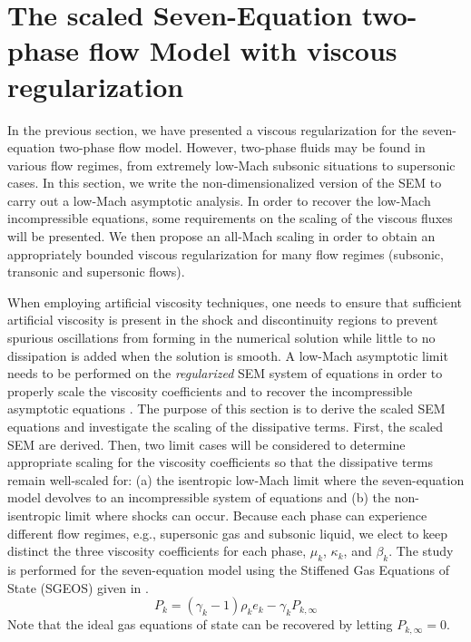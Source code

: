 \documentclass[preprint,10pt]{elsarticle}
\begin{document}
\section{The scaled Seven-Equation two-phase flow Model with viscous regularization}\label{sec:low-Mach}
%
In the previous section, we have presented a viscous regularization for the seven-equation two-phase flow model.  However,
two-phase fluids may be found in various flow regimes, from extremely low-Mach subsonic situations to supersonic cases.
In this section, we write the non-dimensionalized version of the SEM to carry out a low-Mach asymptotic analysis. In order to 
recover the low-Mach incompressible equations, some requirements on the scaling of the viscous fluxes will be presented.  
We then propose an all-Mach scaling in order to obtain an appropriately bounded viscous regularization for many flow regimes
(subsonic, transonic and supersonic flows).

When employing artificial viscosity techniques, one needs to ensure that sufficient artificial viscosity is present in the shock 
and discontinuity regions to prevent spurious oscillations from forming in the numerical solution while little to no dissipation 
is added when the solution is smooth.
A low-Mach asymptotic limit needs to be performed on the {\it regularized} SEM system of equations in order to properly scale the viscosity 
coefficients and to recover the incompressible asymptotic equations \cite{LowMach1, LowMach2, LowMach3}. The purpose of this section is to 
derive the scaled SEM equations and investigate the scaling of the dissipative terms. 
First, the scaled SEM are derived. Then, two limit cases will be considered to determine 
appropriate scaling for the viscosity coefficients so that the dissipative terms remain well-scaled for: 
(a) the isentropic low-Mach limit where the seven-equation model devolves to an incompressible system of 
equations and (b) the non-isentropic limit where shocks can occur. 
Because each phase can experience different flow regimes, e.g., supersonic gas and subsonic liquid, we elect to keep distinct the three viscosity 
coefficients for each phase, $\mu_k$, $\kappa_k$, and $\beta_k$. The study is performed for the seven-equation model using the Stiffened Gas 
Equations of State (SGEOS) \cite{SGEOS} given in .
%
\begin{equation}\label{eq:SGEOS_bis}
P_k = \left( \gamma_k-1 \right) \rho_k e_k - \gamma_k P_{k,\infty}
\end{equation}
Note that the ideal gas equations of state can be recovered by letting $P_{k,\infty}=0$.
%
\end{document}
